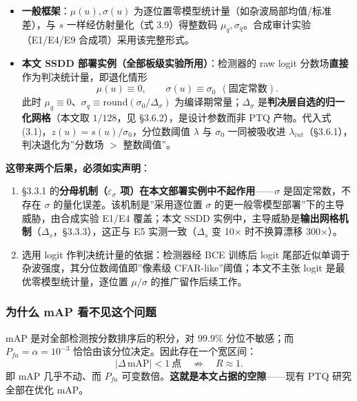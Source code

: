 \begin{itemize}
\tightlist
\item
  \textbf{一般框架}：\(\mu(u),\sigma(u)\)
  为逐位置零模型统计量（如杂波局部均值/标准差），与 \(s\)
  一样经仿射量化（式 3.9）得整数码
  \(\mu_q,\sigma_q\)。合成审计实验（E1/E4/E9 合成项）采用该完整形式。
\item
  \textbf{本文 SSDD 部署实例（全部板级实验所用）}：检测器的 raw logit
  分数场\textbf{直接}作为判决统计量，即退化情形 \[
  \mu(u)\equiv 0,\qquad \sigma(u)\equiv \sigma_{0}\ \ (\text{固定常数}).
  \tag{3.9a}
  \] 此时
  \(\mu_q\equiv0\)、\(\sigma_q\equiv\mathrm{round}(\sigma_0/\Delta_\sigma)\)
  为编译期常量；\(\Delta_\sigma\)
  是\textbf{判决层自选的归一化网格}（本文取 \(1/128\)，见
  §3.6.2），是设计参数而非 PTQ 产物。代入式
  (3.1)，\(z(u)=s(u)/\sigma_0\)，分位数阈值 \(\lambda\) 与 \(\sigma_0\)
  一同被吸收进 \(\lambda_{int}\)（§3.6.1），判决退化为''分数场 \(>\)
  整数阈值''。
\end{itemize}

\textbf{这带来两个后果，必须如实声明}：

\begin{enumerate}
\def\labelenumi{\arabic{enumi}.}
\tightlist
\item
  §3.3.1 的\textbf{分母机制（\(\varepsilon_\sigma\)
  项）在本文部署实例中不起作用}------\(\sigma\) 是固定常数，不存在
  \(\sigma\) 的量化误差。该机制是''采用逐位置 \(\sigma\)
  的更一般零模型部署''下的主导威胁，由合成实验 E1/E4 覆盖；本文 SSDD
  实例中，主导威胁是\textbf{输出网格机制}（\(\Delta_s\)，§3.3.3），这正与
  E5 实测一致（\(\Delta_s\) 变 10× 时不换算漂移 300×）。
\item
  选用 logit 作判决统计量的依据：检测器经 BCE 训练后 logit
  尾部近似单调于杂波强度，其分位数阈值即''像素级
  CFAR-like''阈值；本文不主张 logit 是最优零模型统计量，逐位置
  \(\mu/\sigma\) 的推广留作后续工作。
\end{enumerate}

\subsubsection{为什么 mAP
看不见这个问题}\label{ux4e3aux4ec0ux4e48-map-ux770bux4e0dux89c1ux8fd9ux4e2aux95eeux9898}

mAP 是对全部检测按分数排序后的积分，对 \(99.9\%\) 分位不敏感；而
\(P_{fa}=\alpha=10^{-3}\) 恰恰由该分位决定。因此存在一个宽区间： \[
\big|\Delta\,\mathrm{mAP}\big|<1\ \text{点}\quad\not\Longrightarrow\quad R\approx 1 .
\tag{3.10}
\] 即 mAP 几乎不动、而 \(P_{fa}\)
可变数倍。\textbf{这就是本文占据的空隙}------现有 PTQ 研究全部在优化
mAP。

